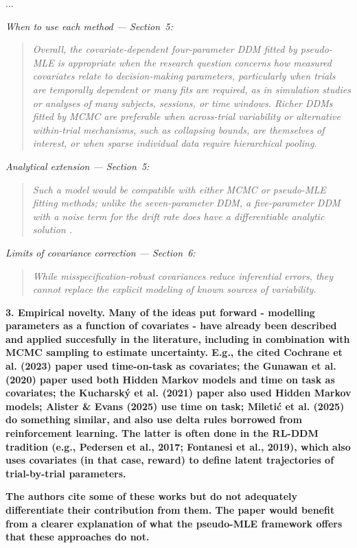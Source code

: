 \documentclass[00-main.tex]{subfiles}
\newcommand{\reviewercomment}[1]{\vspace{0.3cm}\textbf{#1}\vspace{0.15cm}}
\newcommand{\manuscriptquote}[1]{\begin{quote}\textit{#1}\end{quote}}
\begin{document}
...

\emph{When to use each method --- Section~5:}

\manuscriptquote{Overall, the covariate-dependent four-parameter DDM fitted by pseudo-MLE is appropriate when the research question concerns how measured covariates relate to decision-making parameters, particularly when trials are temporally dependent or many fits are required, as in simulation studies or analyses of many subjects, sessions, or time windows. Richer DDMs fitted by MCMC are preferable when across-trial variability or alternative within-trial mechanisms, such as collapsing bounds, are themselves of interest, or when sparse individual data require hierarchical pooling.}

\emph{Analytical extension --- Section~5:}

\manuscriptquote{Such a model would be compatible with either MCMC or pseudo-MLE fitting methods; unlike the seven-parameter DDM, a five-parameter DDM with a noise term for the drift rate does have a differentiable analytic solution \citep{navarro_fast_2009}.}

\emph{Limits of covariance correction --- Section~6:}

\manuscriptquote{While misspecification-robust covariances reduce inferential errors, they cannot replace the explicit modeling of known sources of variability.}

\reviewercomment{3. Empirical novelty. Many of the ideas put forward - modelling parameters as a function of covariates - have already been described and applied succesfully in the literature, including in combination with MCMC sampling to estimate uncertainty. E.g., the cited Cochrane et al. (2023) paper used time-on-task as covariates; the Gunawan et al. (2020) paper used both Hidden Markov models and time on task as covariates; the Kucharský et al. (2021) paper also used Hidden Markov models; Alister \& Evans (2025) use time on task; Miletić et al. (2025) do something similar, and also use delta rules borrowed from reinforcement learning. The latter is often done in the RL-DDM tradition (e.g., Pedersen et al., 2017; Fontanesi et al., 2019), which also uses covariates (in that case, reward) to define latent trajectories of trial-by-trial parameters.}

\reviewercomment{The authors cite some of these works but do not adequately differentiate their contribution from them. The paper would benefit from a clearer explanation of what the pseudo-MLE framework offers that these approaches do not.}
\end{document}
